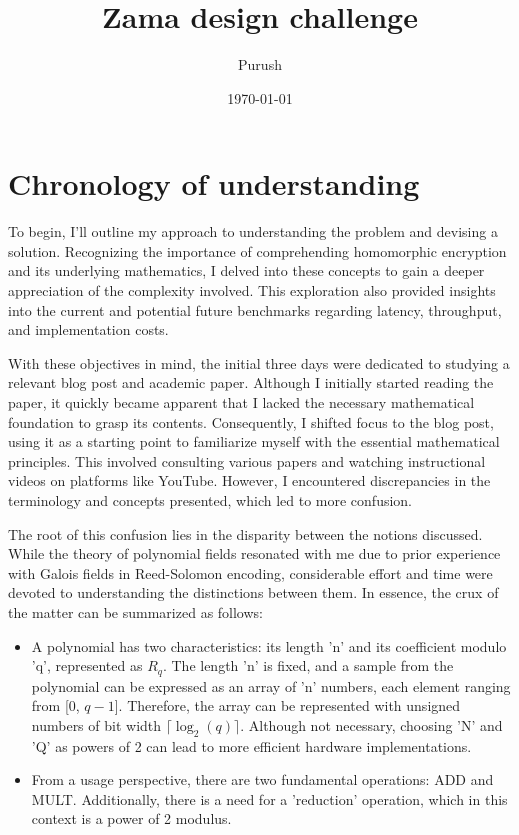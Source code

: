 \documentclass{article}
\title{Zama design challenge}
\author{Purush}
\date{\today}
\begin{document}
    \maketitle 
    
    \section{ Chronology of understanding} %

    To begin, I'll outline my approach to understanding the problem and devising a solution. Recognizing the importance of comprehending homomorphic encryption and its underlying mathematics, I delved into these concepts to gain a deeper appreciation of the complexity involved. This exploration also provided insights into the current and potential future benchmarks regarding latency, throughput, and implementation costs.

    With these objectives in mind, the initial three days were dedicated to studying a relevant blog post and academic paper. Although I initially started reading the paper, it quickly became apparent that I lacked the necessary mathematical foundation to grasp its contents. Consequently, I shifted focus to the blog post, using it as a starting point to familiarize myself with the essential mathematical principles. This involved consulting various papers and watching instructional videos on platforms like YouTube. However, I encountered discrepancies in the terminology and concepts presented, which led to more confusion.
    
    The root of this confusion lies in the disparity between the notions discussed. While the theory of polynomial fields resonated with me due to prior experience with Galois fields in Reed-Solomon encoding, considerable effort and time were devoted to understanding the distinctions between them. In essence, the crux of the matter can be summarized as follows:

    \begin{itemize}
      \item A polynomial has two characteristics: its length 'n' and its coefficient modulo 'q', represented as $R_q$. 
            The length 'n' is fixed, and a sample from the polynomial can be expressed as an array of 'n' numbers, each element ranging from [0, $q-1$]. 
            Therefore, the array can be represented with unsigned numbers of bit width $\lceil \log_2(q) \rceil$. 
            Although not necessary, choosing 'N' and 'Q' as powers of 2 can lead to more efficient hardware implementations.
      \item From a usage perspective, there are two fundamental operations: ADD and MULT. Additionally, 
            there is a need for a 'reduction' operation, which in this context is a power of 2 modulus.
  \end{itemize}
\end{document}
